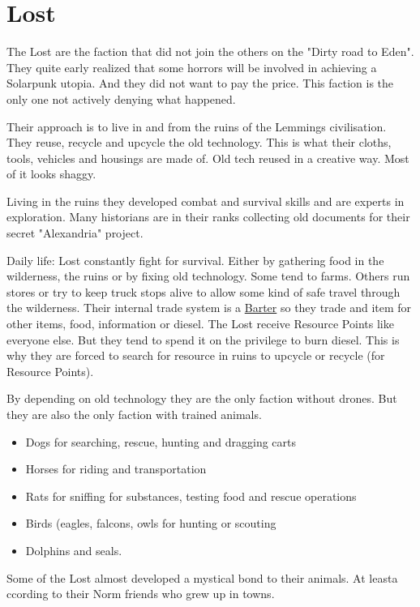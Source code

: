 \section{Lost}

The Lost are the faction that did not join the others on the "Dirty road to Eden". They quite early realized that some horrors will be involved in achieving a Solarpunk utopia. And they did not want to pay the price. This faction is the only one not actively denying what happened.

Their approach is to live in and from the ruins of the Lemmings civilisation. They reuse, recycle and upcycle the old technology. This is what their cloths, tools, vehicles and housings are made of. Old tech reused in a creative way. Most of it looks shaggy.

Living in the ruins they developed combat and survival skills and are experts in exploration.
Many historians are in their ranks collecting old documents for their secret "Alexandria" project.

Daily life: Lost constantly fight for survival. Either by gathering food in the wilderness, the ruins or by fixing old technology. Some tend to farms. Others run stores or try to keep truck stops alive to allow some kind of safe travel through the wilderness. Their internal trade system is a \hyperref[sec:Barter]{Barter} so they trade and item for other items, food, information or diesel.
The Lost receive Resource Points like everyone else. But they tend to spend it on the privilege to burn diesel. This is why they are forced to search for resource in ruins to upcycle or recycle (for Resource Points).

By depending on old technology they are the only faction without drones. But they are also the only faction with trained animals.

\begin{itemize}
    \item Dogs for searching, rescue, hunting and dragging carts
    \item Horses for riding and transportation
    \item Rats for sniffing for substances, testing food and rescue operations
    \item Birds (eagles, falcons, owls for hunting or scouting
    \item Dolphins and seals.
\end{itemize}

Some of the Lost almost developed a mystical bond to their animals. At leasta ccording to their Norm friends who grew up in towns.

